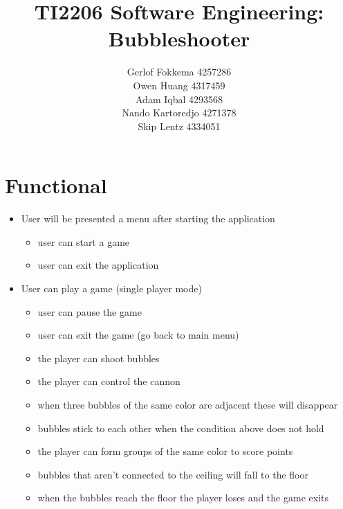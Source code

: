 \documentclass[a4paper,11pt]{article}
\title{TI2206 Software Engineering: Bubbleshooter}
\author{Gerlof Fokkema 4257286 \\
	Owen Huang 4317459 \\
	Adam Iqbal 4293568 \\
	Nando Kartoredjo 4271378 \\
	Skip Lentz 4334051 \\
}
\begin{document}
\maketitle

\newpage
\section*{Functional}
\begin{itemize}
  \item User will be presented a menu after starting the application
  \begin{itemize}
    \item user can start a game
    \item user can exit the application
  \end{itemize}
  \item User can play a game (single player mode)
  \begin{itemize}
    \item user can pause the game
    \item user can exit the game (go back to main menu)
    \item the player can shoot bubbles
    \item the player can control the cannon
    \item when three bubbles of the same color are adjacent these will disappear
    \item bubbles stick to each other when the condition above does not hold
    \item the player can form groups of the same color to score points
    \item bubbles that aren't connected to the ceiling will fall to the floor
    \item when the bubbles reach the floor the player loses and the game exits
  \end{itemize}
\end{itemize}

\newpage
\end{document}
